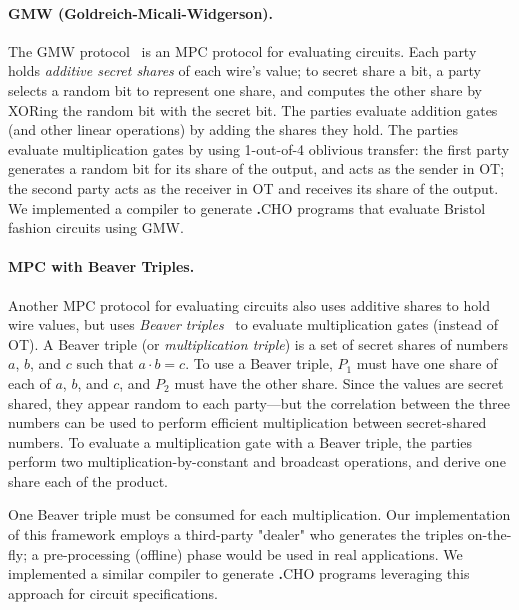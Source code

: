 \documentclass[acmlarge, manuscript, screen, review, anonymous, table]{acmart}
\newcommand{\langname}{\textsc{\textbf{.}CHO}\xspace}
\begin{document}
\paragraph{GMW (Goldreich-Micali-Widgerson).}
The GMW protocol~\cite{goldreich2019play, goldreich2009foundations} is an MPC protocol for evaluating circuits. Each party holds \emph{additive secret shares} of each wire's value; to secret share a bit, a party selects a random bit to represent one share, and computes the other share by XORing the random bit with the secret bit.
%
The parties evaluate addition gates (and other linear operations) by adding the shares they hold.
%
The parties evaluate multiplication gates by using 1-out-of-4 oblivious transfer: the first party generates a random bit for its share of the output, and acts as the sender in OT; the second party acts as the receiver in OT and receives its share of the output. We implemented a compiler to generate \langname programs that evaluate Bristol fashion circuits using GMW.

\paragraph{MPC with Beaver Triples.}
Another MPC protocol for evaluating circuits also uses additive shares to hold wire values,
but uses \emph{Beaver triples}~\cite{beaver1992efficient} to evaluate multiplication gates (instead of OT).
A Beaver triple (or \emph{multiplication triple}) is a set of secret shares of numbers $a$, $b$, and $c$ such that $a \cdot b = c$.
To use a Beaver triple, $P_1$ must have one share of each of $a$, $b$, and $c$, and $P_2$ must have the other share.
Since the values are secret shared, they appear random to each party---but
the correlation between the three numbers can be used to perform efficient multiplication between secret-shared numbers.
To evaluate a multiplication gate with a Beaver triple,
the parties perform two multiplication-by-constant and broadcast operations, and derive one share each of the product.

One Beaver triple must be consumed for each multiplication.
Our implementation of this framework employs a third-party "dealer" who generates the triples on-the-fly;
a pre-processing (offline) phase would be used in real applications.
We implemented a similar compiler to generate \langname programs leveraging this approach for circuit specifications.
\end{document}

